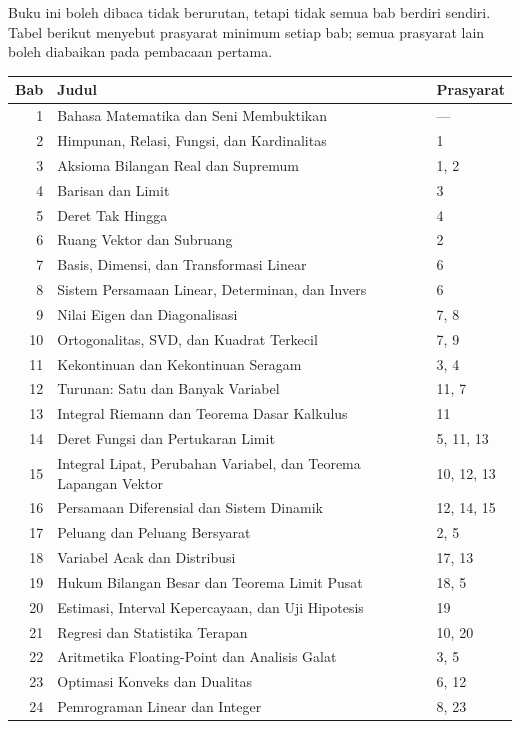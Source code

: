 \documentclass[11pt,a4paper,oneside]{book}
\theoremstyle{definition}
\theoremstyle{plain}
\theoremstyle{remark}
\begin{document}
Buku ini boleh dibaca tidak berurutan, tetapi tidak semua bab berdiri sendiri.
Tabel berikut menyebut prasyarat minimum setiap bab; semua prasyarat lain boleh
diabaikan pada pembacaan pertama.

\begin{center}
\small
\begin{tabular}{@{}r p{9.0cm} p{2.8cm}@{}}
\toprule
\textbf{Bab} & \textbf{Judul} & \textbf{Prasyarat} \\
\midrule
1 & Bahasa Matematika dan Seni Membuktikan & --- \\
2 & Himpunan, Relasi, Fungsi, dan Kardinalitas & 1 \\
3 & Aksioma Bilangan Real dan Supremum & 1, 2 \\
4 & Barisan dan Limit & 3 \\
5 & Deret Tak Hingga & 4 \\
6 & Ruang Vektor dan Subruang & 2 \\
7 & Basis, Dimensi, dan Transformasi Linear & 6 \\
8 & Sistem Persamaan Linear, Determinan, dan Invers & 6 \\
9 & Nilai Eigen dan Diagonalisasi & 7, 8 \\
10 & Ortogonalitas, SVD, dan Kuadrat Terkecil & 7, 9 \\
11 & Kekontinuan dan Kekontinuan Seragam & 3, 4 \\
12 & Turunan: Satu dan Banyak Variabel & 11, 7 \\
13 & Integral Riemann dan Teorema Dasar Kalkulus & 11 \\
14 & Deret Fungsi dan Pertukaran Limit & 5, 11, 13 \\
15 & Integral Lipat, Perubahan Variabel, dan Teorema Lapangan Vektor & 10, 12, 13 \\
16 & Persamaan Diferensial dan Sistem Dinamik & 12, 14, 15 \\
17 & Peluang dan Peluang Bersyarat & 2, 5 \\
18 & Variabel Acak dan Distribusi & 17, 13 \\
19 & Hukum Bilangan Besar dan Teorema Limit Pusat & 18, 5 \\
20 & Estimasi, Interval Kepercayaan, dan Uji Hipotesis & 19 \\
21 & Regresi dan Statistika Terapan & 10, 20 \\
22 & Aritmetika Floating-Point dan Analisis Galat & 3, 5 \\
23 & Optimasi Konveks dan Dualitas & 6, 12 \\
24 & Pemrograman Linear dan Integer & 8, 23 \\

\end{tabular}
\end{center}
\end{document}
